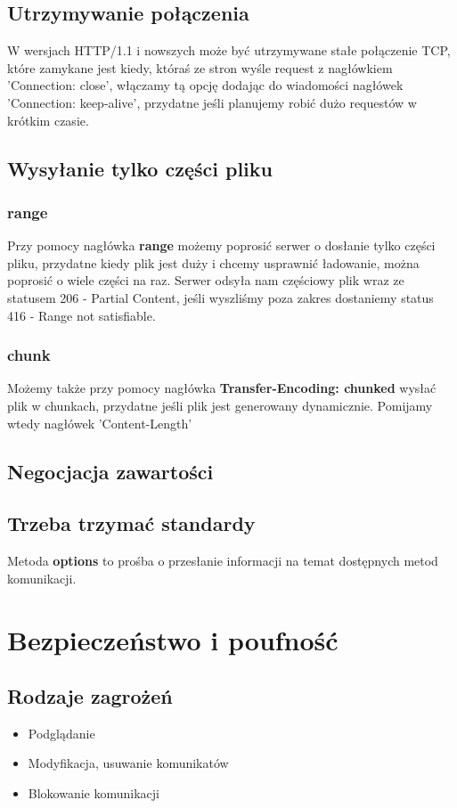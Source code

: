 \documentclass[]{article}
\begin{document}
\subsection{Utrzymywanie połączenia}
W wersjach HTTP/1.1 i nowszych może być utrzymywane stałe połączenie TCP, które zamykane jest kiedy, któraś ze stron wyśle request z nagłówkiem 'Connection: close', włączamy tą opcję dodając do wiadomości nagłówek 'Connection: keep-alive', przydatne jeśli planujemy robić dużo requestów w krótkim czasie.
\subsection{Wysyłanie tylko części pliku}
\subsubsection{range}
Przy pomocy nagłówka \textbf{range} możemy poprosić serwer o dosłanie tylko części pliku, przydatne kiedy plik jest duży i chcemy usprawnić ładowanie, można poprosić o wiele części na raz. Serwer odsyła nam częściowy plik wraz ze statusem 206 - Partial Content, jeśli wyszliśmy poza zakres dostaniemy status 416 - Range not satisfiable.
\subsubsection{chunk}
Możemy także przy pomocy nagłówka \textbf{Transfer-Encoding: chunked} wysłać plik w chunkach, przydatne jeśli plik jest generowany dynamicznie. Pomijamy wtedy nagłówek 'Content-Length'
\subsection{Negocjacja zawartości}
\subsection{Trzeba trzymać standardy}
Metoda \textbf{options} to prośba o przesłanie informacji na temat dostępnych metod komunikacji.
\section{Bezpieczeństwo i poufność}
\subsection{Rodzaje zagrożeń}
\begin{itemize}
    \item Podglądanie
    \item Modyfikacja, usuwanie komunikatów
    \item Blokowanie komunikacji
\end{itemize}
\end{document}
